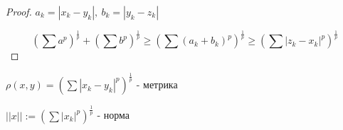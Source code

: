 \begin{proof}
    $a_k = |x_k - y_k|,\ b_k = |y_k - z_k|$

    \[ \left( \sum a^p \right)^\frac{1}{p} + \left( \sum b^p \right)^\frac{1}{p} 
    \geqslant \left( \sum (a_k+b_k)^p \right)^\frac{1}{p} \geqslant \left( \sum |z_k-x_k|^p \right)^\frac{1}{p} \]
    
\end{proof}

\begin{notice}
$\rho(x, y) = \left( \sum |x_k-y_k|^p \right)^\frac{1}{p}$ - метрика

$||x|| := \left( \sum |x_k|^p \right)^\frac{1}{p}$ - норма
\end{notice}